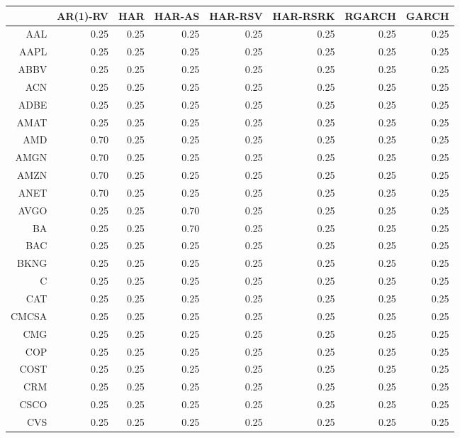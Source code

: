 \begin{table}[ht]
\centering
\begin{tabular}{rrrrrrrr}
  \hline
 & AR(1)-RV & HAR & HAR-AS & HAR-RSV & HAR-RSRK & RGARCH & GARCH \\ 
  \hline
AAL & 0.25 & 0.25 & 0.25 & 0.25 & 0.25 & 0.25 & 0.25 \\ 
  AAPL & 0.25 & 0.25 & 0.25 & 0.25 & 0.25 & 0.25 & 0.25 \\ 
  ABBV & 0.25 & 0.25 & 0.25 & 0.25 & 0.25 & 0.25 & 0.25 \\ 
  ACN & 0.25 & 0.25 & 0.25 & 0.25 & 0.25 & 0.25 & 0.25 \\ 
  ADBE & 0.25 & 0.25 & 0.25 & 0.25 & 0.25 & 0.25 & 0.25 \\ 
  AMAT & 0.25 & 0.25 & 0.25 & 0.25 & 0.25 & 0.25 & 0.25 \\ 
  AMD & 0.70 & 0.25 & 0.25 & 0.25 & 0.25 & 0.25 & 0.25 \\ 
  AMGN & 0.70 & 0.25 & 0.25 & 0.25 & 0.25 & 0.25 & 0.25 \\ 
  AMZN & 0.70 & 0.25 & 0.25 & 0.25 & 0.25 & 0.25 & 0.25 \\ 
  ANET & 0.70 & 0.25 & 0.25 & 0.25 & 0.25 & 0.25 & 0.25 \\ 
  AVGO & 0.25 & 0.25 & 0.70 & 0.25 & 0.25 & 0.25 & 0.25 \\ 
  BA & 0.25 & 0.25 & 0.70 & 0.25 & 0.25 & 0.25 & 0.25 \\ 
  BAC & 0.25 & 0.25 & 0.25 & 0.25 & 0.25 & 0.25 & 0.25 \\ 
  BKNG & 0.25 & 0.25 & 0.25 & 0.25 & 0.25 & 0.25 & 0.25 \\ 
  C & 0.25 & 0.25 & 0.25 & 0.25 & 0.25 & 0.25 & 0.25 \\ 
  CAT & 0.25 & 0.25 & 0.25 & 0.25 & 0.25 & 0.25 & 0.25 \\ 
  CMCSA & 0.25 & 0.25 & 0.25 & 0.25 & 0.25 & 0.25 & 0.25 \\ 
  CMG & 0.25 & 0.25 & 0.25 & 0.25 & 0.25 & 0.25 & 0.25 \\ 
  COP & 0.25 & 0.25 & 0.25 & 0.25 & 0.25 & 0.25 & 0.25 \\ 
  COST & 0.25 & 0.25 & 0.25 & 0.25 & 0.25 & 0.25 & 0.25 \\ 
  CRM & 0.25 & 0.25 & 0.25 & 0.25 & 0.25 & 0.25 & 0.25 \\ 
  CSCO & 0.25 & 0.25 & 0.25 & 0.25 & 0.25 & 0.25 & 0.25 \\ 
  CVS & 0.25 & 0.25 & 0.25 & 0.25 & 0.25 & 0.25 & 0.25 \\ 

\end{tabular}
\end{table}
